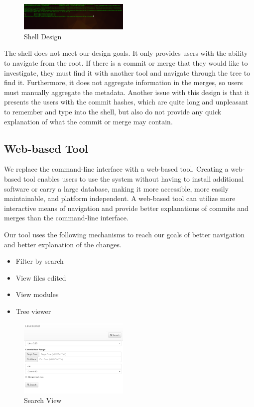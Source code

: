 \documentclass[conference, draftclsnofoot]{IEEEtran}
\begin{document}
\begin{figure}
        \centering
        \includegraphics[width=0.47\textwidth]{figures/shell.png}
        \caption{Shell Design}
        \label{fig:shell}
\end{figure}

The shell does not meet our design goals. It only provides users with the ability to
navigate from the root. If there is a commit or merge that they would like to
investigate, they must find it with another tool and navigate through the tree to
find it. Furthermore, it does not aggregate information in the merges, so users must
manually aggregate the metadata. Another issue with this design is that it presents
the users with the commit hashes, which are quite long and unpleasant to remember
and type into the shell, but also do not provide any quick explanation of what the
commit or merge may contain.

\subsection{Web-based Tool}

We replace the command-line interface with a web-based tool. Creating a web-based
tool enables users to use the system without having to install additional software
or carry a large database, making it more accessible, more easily maintainable, and
platform independent. A web-based tool can utilize more interactive means of
navigation and provide better explanations of commits and merges than the
command-line interface.

Our tool uses the following mechanisms to reach our goals of better navigation and
better explanation of the changes.

\begin{itemize}
        \item Filter by search
        \item View files edited
        \item View modules
        \item Tree viewer
\end{itemize}


\begin{figure}
        \centering
        \includegraphics[width=0.47\textwidth]{figures/search.png}
        \caption{Search View}
        \label{fig:search}
\end{figure}
\end{document}
